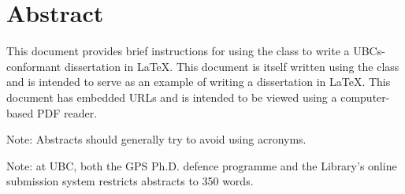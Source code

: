 
\chapter{Abstract}

This document provides brief instructions for using the 
class to write a \acp{UBC}-conformant dissertation in \LaTeX.  This
document is itself written using the  class and is
intended to serve as an example of writing a dissertation in \LaTeX.
This document has embedded \acp{URL} and is intended to be viewed
using a computer-based \ac{PDF} reader.

Note: Abstracts should generally try to avoid using acronyms.

Note: at \ac{UBC}, both the \ac{GPS} Ph.D. defence programme and the
Library's online submission system restricts abstracts to 350
words.

